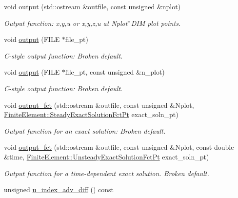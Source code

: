 \begin{DoxyCompactItemize}
void \hyperlink{classoomph_1_1RefineableBuoyantQCrouzeixRaviartElement_a36bc6dc9052947f0932a605dd4d0e8f0}{output} (std\+::ostream \&outfile, const unsigned \&nplot)
\begin{DoxyCompactList}\small\item\em Output function\+: x,y,u or x,y,z,u at Nplot$^\wedge$\+D\+IM plot points. \end{DoxyCompactList}\item 
void \hyperlink{classoomph_1_1RefineableBuoyantQCrouzeixRaviartElement_a90579086f991da7fbaf7d92b29abf994}{output} (F\+I\+LE $\ast$file\+\_\+pt)
\begin{DoxyCompactList}\small\item\em C-\/style output function\+: Broken default. \end{DoxyCompactList}\item 
void \hyperlink{classoomph_1_1RefineableBuoyantQCrouzeixRaviartElement_a650e1b0428cd160c72dbc3deda287b26}{output} (F\+I\+LE $\ast$file\+\_\+pt, const unsigned \&n\+\_\+plot)
\begin{DoxyCompactList}\small\item\em C-\/style output function\+: Broken default. \end{DoxyCompactList}\item 
void \hyperlink{classoomph_1_1RefineableBuoyantQCrouzeixRaviartElement_a9f9feaf2d6003f2328741de2987fd0d1}{output\+\_\+fct} (std\+::ostream \&outfile, const unsigned \&Nplot, \hyperlink{classoomph_1_1FiniteElement_a690fd33af26cc3e84f39bba6d5a85202}{Finite\+Element\+::\+Steady\+Exact\+Solution\+Fct\+Pt} exact\+\_\+soln\+\_\+pt)
\begin{DoxyCompactList}\small\item\em Output function for an exact solution\+: Broken default. \end{DoxyCompactList}\item 
void \hyperlink{classoomph_1_1RefineableBuoyantQCrouzeixRaviartElement_aa1eaab23a14039a18701b5666629b5bc}{output\+\_\+fct} (std\+::ostream \&outfile, const unsigned \&Nplot, const double \&time, \hyperlink{classoomph_1_1FiniteElement_ad4ecf2b61b158a4b4d351a60d23c633e}{Finite\+Element\+::\+Unsteady\+Exact\+Solution\+Fct\+Pt} exact\+\_\+soln\+\_\+pt)
\begin{DoxyCompactList}\small\item\em Output function for a time-\/dependent exact solution. Broken default. \end{DoxyCompactList}\item 
unsigned \hyperlink{classoomph_1_1RefineableBuoyantQCrouzeixRaviartElement_ac6a973ee5e4d7425db2e7f9a259bab46}{u\+\_\+index\+\_\+adv\+\_\+diff} () const

\end{DoxyCompactItemize}
